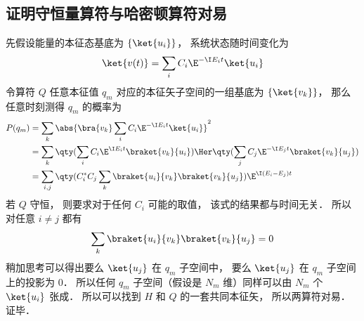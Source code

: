 \subsection{证明守恒量算符与哈密顿算符对易}
先假设能量的本征态基底为 $\{\ket{u_i}\}$， 系统状态随时间变化为
\begin{equation}
\ket{v(t)} = \sum_i C_i \E^{-\I E_i t} \ket{u_i}
\end{equation}
令算符 $Q$ 任意本征值 $q_m$ 对应的本征矢子空间的一组基底为 $\{\ket{v_k}\}$， 那么任意时刻测得 $q_m$ 的概率为
\begin{equation}
\begin{aligned}
P(q_m) &= \sum_k \abs{\bra{v_k} \sum_i C_i \E^{-\I E_i t} \ket{u_i}}^2\\
&= \sum_k \qty(\sum_i C_i \E^{\I E_i t} \braket{v_k}{u_i})\Her \qty(\sum_j C_j \E^{-\I E_j t} \braket{v_k}{u_j})\\
&= \sum_{i,j} \qty( C_i^* C_j \sum_k \braket{u_i}{v_k} \braket{v_k}{u_j}) \E^{\I (E_i - E_j) t}
\end{aligned}
\end{equation}
若 $Q$ 守恒， 则要求对于任何 $C_i$ 可能的取值， 该式的结果都与时间无关． 所以对任意 $i \ne j$ 都有
\begin{equation}
\sum_k \braket{u_i}{v_k} \braket{v_k}{u_j} = 0
\end{equation}
稍加思考可以得出要么 $\ket{u_j}$ 在 $q_m$ 子空间中， 要么 $\ket{u_j}$ 在 $q_m$ 子空间上的投影为 0． 所以任何 $q_m$ 子空间（假设是 $N_m$ 维）同样可以由 $N_m$ 个 $\ket{u_i}$ 张成． 所以可以找到 $H$ 和 $Q$ 的一套共同本征矢， 所以两算符对易． 证毕．
